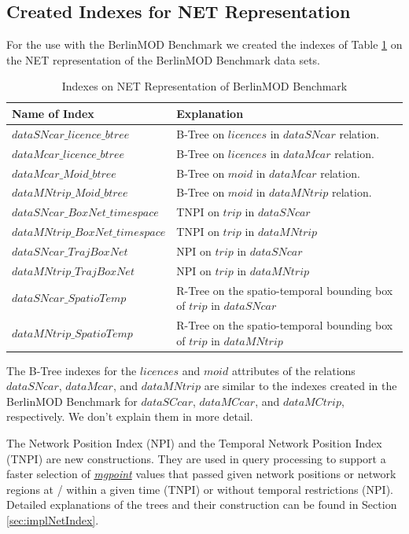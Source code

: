 \documentclass[a4paper]{article}
\newcommand{\bmodb} {BerlinMOD Benchmark}
\newcommand{\dt}[1]{\textsl{\underline{#1}}}
\begin{document}
\subsection{Created Indexes for NET Representation}
\label{sec:createIndex}
For the use with the \bmodb{} we created the indexes of Table \ref{tab:NETIndexes} on the NET representation of the \bmodb{} data sets.
\begin{table}[H]
  \caption{Indexes on NET Representation of \bmodb{}}
  \label{tab:NETIndexes}
  \begin{tabularx}{\textwidth}{|l|X|}
    \hline
    \textbf{Name of Index}& \textbf{Explanation}\\
    \hline
    $dataSNcar\_licence\_btree$& B-Tree on $licences$ in $dataSNcar$ relation.\\
    \hline
    $dataMcar\_licence\_btree$& B-Tree on $licences$ in $dataMcar$ relation.\\
    \hline
    $dataMcar\_Moid\_btree$& B-Tree on $moid$ in $dataMcar$ relation.\\
    \hline
    $dataMNtrip\_Moid\_btree$& B-Tree on $moid$ in $dataMNtrip$ relation.\\
    \hline
    $dataSNcar\_BoxNet\_timespace$ & TNPI on $trip$ in $dataSNcar$ \\
    \hline
    $dataMNtrip\_BoxNet\_timespace$ & TNPI on $trip$ in $dataMNtrip$\\
    \hline
    $dataSNcar\_TrajBoxNet$ & NPI on $trip$ in $dataSNcar$\\
    \hline
    $dataMNtrip\_TrajBoxNet$ & NPI on $trip$ in $dataMNtrip$\\
    \hline
    $dataSNcar\_SpatioTemp$ & R-Tree on the spatio-temporal bounding box of $trip$ in $dataSNcar$\\
    \hline
    $dataMNtrip\_SpatioTemp$ & R-Tree on the spatio-temporal bounding box of $trip$ in $dataMNtrip$\\
    \hline
  \end{tabularx}
\end{table}

The B-Tree indexes for the $licences$ and $moid$ attributes of the relations
$dataSNcar$, $dataMcar$, and $dataMNtrip$ are similar to the indexes
created in the \bmodb{} for $dataSCcar$, $dataMCcar$, and $dataMCtrip$,
respectively. We don't explain them in more detail.

The Network Position Index (NPI) and the Temporal Network Position Index (TNPI)
are new constructions. They are used in query processing to support a faster
selection of \dt{mgpoint} values that passed given network positions or network
regions at / within a given time (TNPI) or without temporal restrictions (NPI).
Detailed explanations of the trees and their construction can be found in
Section \ref{sec:implNetIndex}.
\end{document}
